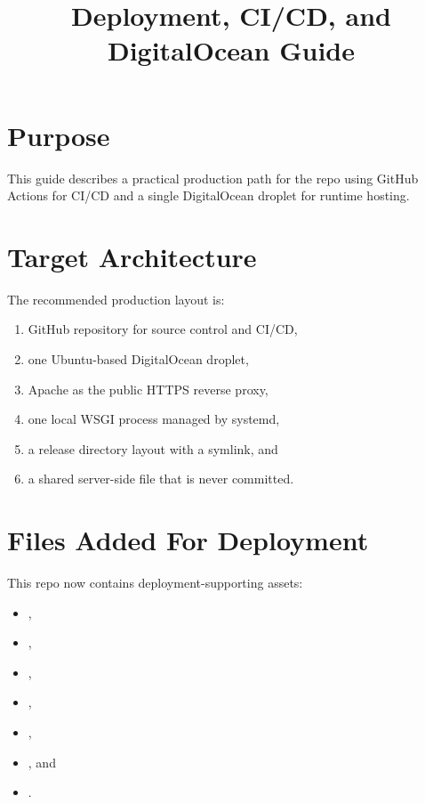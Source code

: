 \documentclass[conference]{IEEEtran}
\title{Deployment, CI/CD, and DigitalOcean Guide}
\author{\TGIRArticleAuthorBlock}
\begin{document}
\maketitle

\section{Purpose}
This guide describes a practical production path for the repo using GitHub Actions for CI/CD and a single DigitalOcean droplet for runtime hosting.

\section{Target Architecture}
The recommended production layout is:
\begin{enumerate}[leftmargin=1.5em]
    \item GitHub repository for source control and CI/CD,
    \item one Ubuntu-based DigitalOcean droplet,
    \item Apache as the public HTTPS reverse proxy,
    \item one local WSGI process managed by systemd,
    \item a release directory layout with a  symlink, and
    \item a shared server-side  file that is never committed.
\end{enumerate}

\section{Files Added For Deployment}
This repo now contains deployment-supporting assets:
\begin{itemize}[leftmargin=1.5em]
    \item {},
    \item {},
    \item {},
    \item {},
    \item {},
    \item {}, and
    \item {}.
\end{itemize}
\end{document}
